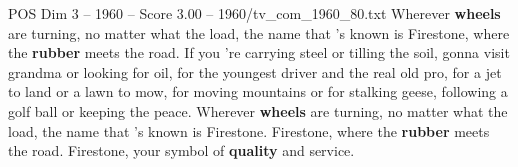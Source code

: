 \begin{textsample}{POS Dim 3 – 1960 – Score 3.00 – 1960/tv\_com\_1960\_80.txt}  \label{ex:f3_pos_024}
Wherever \textbf{wheels} are turning, no matter what the load, the name that 's known is Firestone, where the \textbf{rubber} meets the road.
If you 're carrying steel or tilling the soil, gonna visit grandma or looking for oil, for the youngest driver and the real old pro, for a jet to land or a lawn to mow, for moving mountains or for stalking geese, following a golf ball or keeping the peace.
Wherever \textbf{wheels} are turning, no matter what the load, the name that 's known is Firestone.
Firestone, where the \textbf{rubber} meets the road.
Firestone, your symbol of \textbf{quality} and service.

\end{textsample}
